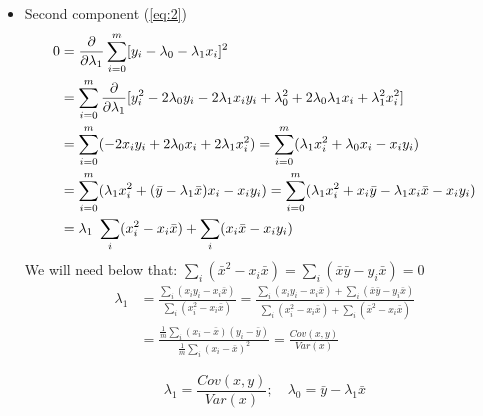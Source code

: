 \documentclass[12pt]{article}
\numberwithin{equation}{section}
\begin{document}
\begin{itemize}
\item Second component (\ref{eq:2})
\begin{align*}
	0 &= \pdv{}{\lambda_1} \sum_{i=0}^m [y_i - \lambda_0 - \lambda_1 x_i]^2 \\
	&=  \sum_{i=0}^m\pdv{}{\lambda_1} [y_i^2 - 2\lambda_0y_i - 2\lambda_1x_iy_i + \lambda_0^2 + 2\lambda_0\lambda_1x_i + \lambda_1^2x_i^2]\\
	&= \sum_{i=0}^m(-2x_iy_i + 2\lambda_0x_i + 2\lambda_1x_i^2)= \sum_{i=0}^m (\lambda_1x_i^2 + \lambda_0x_i - x_iy_i)\\
	& = \sum_{i=0}^m (\lambda_1x_i^2 + (\bar{y} - \lambda_1\bar{x})x_i - x_iy_i)= \sum_{i=0}^m (\lambda_1x_i^2 + x_i\bar{y} - \lambda_1x_i\bar{x} - x_iy_i)\\
	&= \lambda_1\ \sum_i(x_i^2 - x_i\bar{x}) + \sum_i (x_i\bar{x} - x_iy_i)\\
\end{align*}
We will need below that: $ \sum_i (\bar{x}^2 - x_i\bar{x})  = \sum_i (\bar{x}\bar{y} - y_i\bar{x}) = 0$
\begin{align*}
		\lambda_1 &= \frac{\sum_i (x_iy_i - x_i\bar{x} )}{\sum_i(x_i^2 - x_i\bar{x})} =  \frac{\sum_i (x_iy_i - x_i\bar{x} ) + \sum_i (\bar{x}\bar{y} - y_i\bar{x}) }{\sum_i(x_i^2 - x_i\bar{x}) + \sum_i (\bar{x}^2 - x_i\bar{x}) } \\
		&= \frac{\frac{1}{m} \sum_i (x_i-\bar{x})(y_i-\bar{y})}{\frac{1}{m} \sum_i (x_i-\bar{x})^2} = \frac{Cov(x,y)}{Var(x)}
\end{align*}

\begin{equation}
		\boxed{\lambda_1 =\frac{Cov(x,y)}{Var(x)};\quad \lambda_0 =  \bar{y} - \lambda_1\bar{x} }
\end{equation}

\end{itemize}
\end{document}
